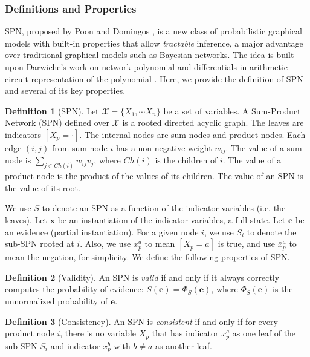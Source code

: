 \documentclass[10pt, titlepage]{article}
\theoremstyle{definition}
\newtheorem{definition}{Definition}[section]
\newcommand\mb{\mathbf}
\begin{document}
\subsubsection{Definitions and Properties}

SPN, proposed by Poon and Domingos \cite{poon2011sum}, is a new class of probabilistic graphical models with built-in properties that allow \textit{tractable} inference, a major advantage over traditional graphical models such as Bayesian networks. The idea is built upon Darwiche's work on network polynomial and differentials in arithmetic circuit representation of the polynomial \cite{darwiche2003differential}. Here, we provide the definition of SPN and several of its key properties.

\begin{definition}[SPN]
\cite{poon2011sum}
Let $\mathcal{X}=\{X_1,\cdots X_n\}$ be a set of variables. A Sum-Product Network (SPN) defined over $\mathcal{X}$ is a rooted directed acyclic graph. The leaves are indicators $[X_p= \cdot ]$. The internal nodes are sum nodes and product nodes. Each edge $(i,j)$ from sum node $i$ has a non-negative weight $w_{ij}$. The value of a sum node is $\sum_{j\in Ch(i)}w_{ij}v_j$, where $Ch(i)$ is the children of $i$. The value of a product node is the product of the values of its children. The value of an SPN is the value of its root.
\end{definition}

We use $S$ to denote an SPN as a function of the indicator variables (i.e. the leaves). Let $\mb{x}$ be an instantiation of the indicator variables, a full state. Let $\mb{e}$ be an evidence (partial instantiation). For a given node $i$, we use $S_i$ to denote the sub-SPN rooted at $i$. Also, we use $x_{p}^a$ to mean $[X_p=a]$ is true, and use $\bar{x}_p^a$ to mean the negation, for simplicity. We define the following properties of SPN.

\begin{definition}[Validity]
An SPN is \textit{valid} if and only if it always correctly computes the probability of evidence: $S(\mb{e})=\Phi_S(\mb{e})$, where $\Phi_S(\mb{e})$ is the unnormalized probability of $\mb{e}$.
\end{definition}

\begin{definition}[Consistency]
An SPN is \textit{consistent} if and only if for every product node $i$, there is no variable $X_p$ that has indicator $x_p^a$ as one leaf of the sub-SPN $S_i$ and indicator $x_p^b$ with $b\neq a$ as another leaf.
\end{definition}
\end{document}
